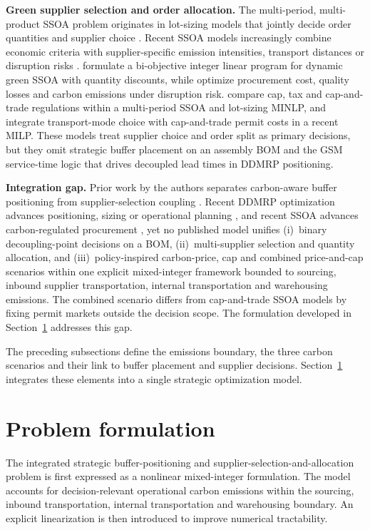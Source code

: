 \documentclass[preprint,12pt,authoryear]{elsarticle}
\begin{document}
\textbf{Green supplier selection and order allocation.}
The multi-period, multi-product SSOA problem originates in lot-sizing models that jointly decide order quantities and supplier choice \citep{basnet2005}. Recent SSOA models increasingly combine economic criteria with supplier-specific emission intensities, transport distances or disruption risks \citep{mirzaee2023,hamdan2023,shi2025}. \citet{hamdan2023} formulate a bi-objective integer linear program for dynamic green SSOA with quantity discounts, while \citet{shi2025} optimize procurement cost, quality losses and carbon emissions under disruption risk. \citet{lamba2019cie} compare cap, tax and cap-and-trade regulations within a multi-period SSOA and lot-sizing MINLP, and \citet{rosyidi2024} integrate transport-mode choice with cap-and-trade permit costs in a recent MILP. These models treat supplier choice and order split as primary decisions, but they omit strategic buffer placement on an assembly BOM and the GSM service-time logic that drives decoupled lead times in DDMRP positioning.

\textbf{Integration gap.}
Prior work by the authors separates carbon-aware buffer positioning \citep{achergui3} from supplier-selection coupling \citep{ACHERGUI4}. Recent DDMRP optimization advances positioning, sizing or operational planning \citep{younespour2024,krajcovic2024}, and recent SSOA advances carbon-regulated procurement \citep{hamdan2023,shi2025,rosyidi2024}, yet no published model unifies (i)~binary decoupling-point decisions on a BOM, (ii)~multi-supplier selection and quantity allocation, and (iii)~policy-inspired carbon-price, cap and combined price-and-cap scenarios within one explicit mixed-integer framework bounded to sourcing, inbound supplier transportation, internal transportation and warehousing emissions. The combined scenario differs from cap-and-trade SSOA models \citep{mirzaee2023,rosyidi2024} by fixing permit markets outside the decision scope. The formulation developed in Section~\ref{sec3} addresses this gap.

The preceding subsections define the emissions boundary, the three carbon scenarios and their link to buffer placement and supplier decisions. Section~\ref{sec3} integrates these elements into a single strategic optimization model.
\section{Problem formulation}\label{sec3}
The integrated strategic buffer-positioning and supplier-selection-and-allocation problem is first expressed as a nonlinear mixed-integer formulation. The model accounts for decision-relevant operational carbon emissions within the sourcing, inbound transportation, internal transportation and warehousing boundary. An explicit linearization is then introduced to improve numerical tractability.
\end{document}

